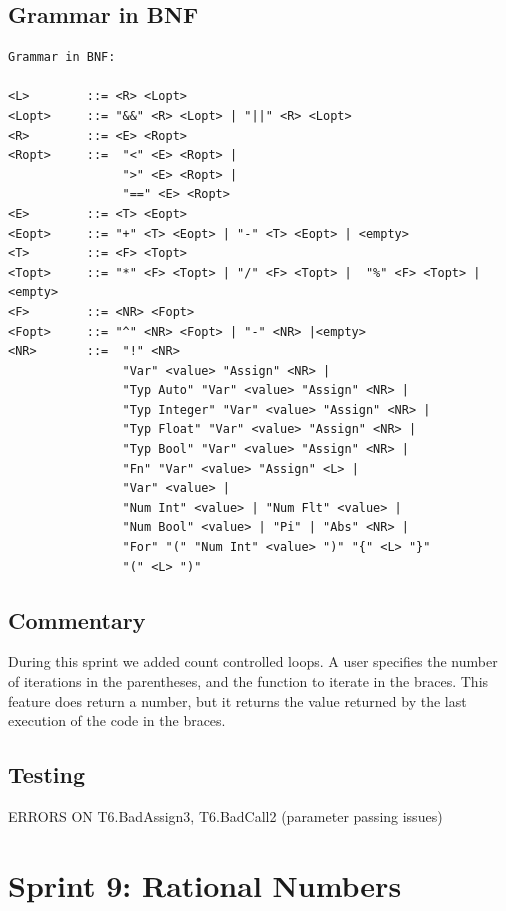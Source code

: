 \documentclass[a4paper, oneside, 11pt]{report}
\begin{document}
    \subsection{Grammar in BNF}
    \begin{verbatim}
Grammar in BNF:

<L>        ::= <R> <Lopt>
<Lopt>     ::= "&&" <R> <Lopt> | "||" <R> <Lopt>
<R>        ::= <E> <Ropt>
<Ropt>     ::=  "<" <E> <Ropt> |
                ">" <E> <Ropt> |
                "==" <E> <Ropt>
<E>        ::= <T> <Eopt>
<Eopt>     ::= "+" <T> <Eopt> | "-" <T> <Eopt> | <empty>
<T>        ::= <F> <Topt>
<Topt>     ::= "*" <F> <Topt> | "/" <F> <Topt> |  "%" <F> <Topt> |<empty>
<F>        ::= <NR> <Fopt>
<Fopt>     ::= "^" <NR> <Fopt> | "-" <NR> |<empty>
<NR>       ::=  "!" <NR>
                "Var" <value> "Assign" <NR> |
                "Typ Auto" "Var" <value> "Assign" <NR> |
                "Typ Integer" "Var" <value> "Assign" <NR> |
                "Typ Float" "Var" <value> "Assign" <NR> |
                "Typ Bool" "Var" <value> "Assign" <NR> |
                "Fn" "Var" <value> "Assign" <L> |
                "Var" <value> |
                "Num Int" <value> | "Num Flt" <value> |
                "Num Bool" <value> | "Pi" | "Abs" <NR> |
                "For" "(" "Num Int" <value> ")" "{" <L> "}"
                "(" <L> ")"
    \end{verbatim}
    \subsection{Commentary}
    During this sprint we added count controlled loops. A user specifies the number of iterations in the parentheses, and the function to iterate in the braces. This feature does return a number, but it returns the value returned by the last execution of the code in the braces.

    \subsection{Testing}
    ERRORS ON T6.BadAssign3, T6.BadCall2 (parameter passing issues)


    \clearpage
    \section{Sprint 9: Rational Numbers}
\end{document}
